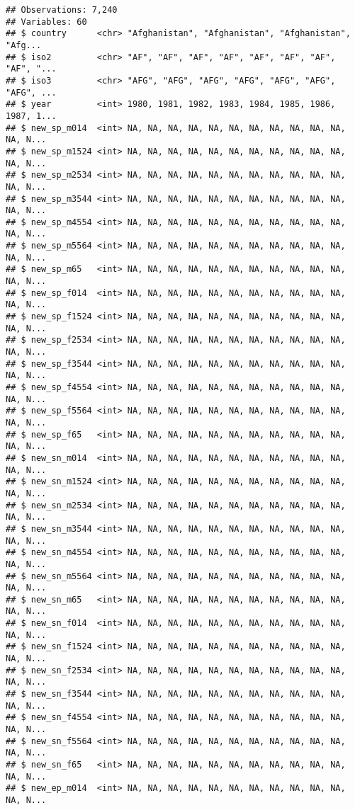 \documentclass[]{article}
\begin{document}
\begin{verbatim}
## Observations: 7,240
## Variables: 60
## $ country      <chr> "Afghanistan", "Afghanistan", "Afghanistan", "Afg...
## $ iso2         <chr> "AF", "AF", "AF", "AF", "AF", "AF", "AF", "AF", "...
## $ iso3         <chr> "AFG", "AFG", "AFG", "AFG", "AFG", "AFG", "AFG", ...
## $ year         <int> 1980, 1981, 1982, 1983, 1984, 1985, 1986, 1987, 1...
## $ new_sp_m014  <int> NA, NA, NA, NA, NA, NA, NA, NA, NA, NA, NA, NA, N...
## $ new_sp_m1524 <int> NA, NA, NA, NA, NA, NA, NA, NA, NA, NA, NA, NA, N...
## $ new_sp_m2534 <int> NA, NA, NA, NA, NA, NA, NA, NA, NA, NA, NA, NA, N...
## $ new_sp_m3544 <int> NA, NA, NA, NA, NA, NA, NA, NA, NA, NA, NA, NA, N...
## $ new_sp_m4554 <int> NA, NA, NA, NA, NA, NA, NA, NA, NA, NA, NA, NA, N...
## $ new_sp_m5564 <int> NA, NA, NA, NA, NA, NA, NA, NA, NA, NA, NA, NA, N...
## $ new_sp_m65   <int> NA, NA, NA, NA, NA, NA, NA, NA, NA, NA, NA, NA, N...
## $ new_sp_f014  <int> NA, NA, NA, NA, NA, NA, NA, NA, NA, NA, NA, NA, N...
## $ new_sp_f1524 <int> NA, NA, NA, NA, NA, NA, NA, NA, NA, NA, NA, NA, N...
## $ new_sp_f2534 <int> NA, NA, NA, NA, NA, NA, NA, NA, NA, NA, NA, NA, N...
## $ new_sp_f3544 <int> NA, NA, NA, NA, NA, NA, NA, NA, NA, NA, NA, NA, N...
## $ new_sp_f4554 <int> NA, NA, NA, NA, NA, NA, NA, NA, NA, NA, NA, NA, N...
## $ new_sp_f5564 <int> NA, NA, NA, NA, NA, NA, NA, NA, NA, NA, NA, NA, N...
## $ new_sp_f65   <int> NA, NA, NA, NA, NA, NA, NA, NA, NA, NA, NA, NA, N...
## $ new_sn_m014  <int> NA, NA, NA, NA, NA, NA, NA, NA, NA, NA, NA, NA, N...
## $ new_sn_m1524 <int> NA, NA, NA, NA, NA, NA, NA, NA, NA, NA, NA, NA, N...
## $ new_sn_m2534 <int> NA, NA, NA, NA, NA, NA, NA, NA, NA, NA, NA, NA, N...
## $ new_sn_m3544 <int> NA, NA, NA, NA, NA, NA, NA, NA, NA, NA, NA, NA, N...
## $ new_sn_m4554 <int> NA, NA, NA, NA, NA, NA, NA, NA, NA, NA, NA, NA, N...
## $ new_sn_m5564 <int> NA, NA, NA, NA, NA, NA, NA, NA, NA, NA, NA, NA, N...
## $ new_sn_m65   <int> NA, NA, NA, NA, NA, NA, NA, NA, NA, NA, NA, NA, N...
## $ new_sn_f014  <int> NA, NA, NA, NA, NA, NA, NA, NA, NA, NA, NA, NA, N...
## $ new_sn_f1524 <int> NA, NA, NA, NA, NA, NA, NA, NA, NA, NA, NA, NA, N...
## $ new_sn_f2534 <int> NA, NA, NA, NA, NA, NA, NA, NA, NA, NA, NA, NA, N...
## $ new_sn_f3544 <int> NA, NA, NA, NA, NA, NA, NA, NA, NA, NA, NA, NA, N...
## $ new_sn_f4554 <int> NA, NA, NA, NA, NA, NA, NA, NA, NA, NA, NA, NA, N...
## $ new_sn_f5564 <int> NA, NA, NA, NA, NA, NA, NA, NA, NA, NA, NA, NA, N...
## $ new_sn_f65   <int> NA, NA, NA, NA, NA, NA, NA, NA, NA, NA, NA, NA, N...
## $ new_ep_m014  <int> NA, NA, NA, NA, NA, NA, NA, NA, NA, NA, NA, NA, N...

\end{verbatim}
\end{document}
